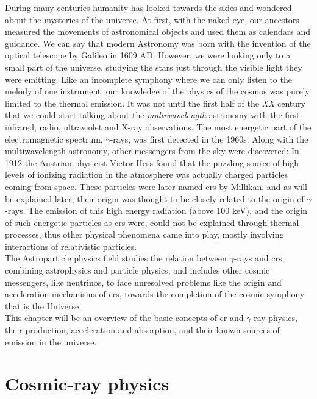 \documentclass[main.tex]{subfiles}
\begin{document}
\glsresetall
During many centuries humanity has looked towards the skies and wondered about the mysteries of the universe. At first, with the naked eye, our ancestors measured the movements of astronomical objects and used them as calendars and guidance. We can say that modern Astronomy was born with the invention of the optical telescope by Galileo in 1609 AD. However, we were looking only to a small part of the universe, studying the stars just through the visible light they were emitting. Like an incomplete symphony where we can only listen to the melody of one instrument, our knowledge of the physics of the cosmos was purely limited to the thermal emission. It was not until the first half of the \textit{XX} century that we could start talking about the \textit{multiwavelength} astronomy with the first infrared, radio, ultraviolet and X-ray observations. The most energetic part of the electromagnetic spectrum, $\gamma$-rays, was first detected in the 1960s.
Along with the multiwavelength astronomy, other messengers from the sky were discovered: In 1912 the Austrian physicist Victor Hess found that the puzzling source of high levels of ionizing radiation in the atmosphere was actually charged particles coming from space. These particles were later named \glspl{cr} by Millikan, and as will be explained later, their origin was thought to be closely related to the origin of $\gamma$-rays. The emission of this high energy radiation (above 100 keV), and the origin of such energetic particles as \glspl{cr} were, could not be explained through thermal processes, thus other physical phenomena came into play, mostly involving interactions of relativistic particles.\\ 
The Astroparticle physics field studies the relation between $\gamma$-rays and \glspl{cr}, combining astrophysics and particle physics, and includes other cosmic messengers, like neutrinos, to face unresolved problems like the origin and acceleration mechanisms of \glspl{cr}, towards the completion of the cosmic symphony that is the Universe.\\
This chapter will be an overview of the basic concepts of \gls{cr} and $\gamma$-ray physics, their production, acceleration and absorption, and their known sources of emission in the universe.

\section{Cosmic-ray physics}
\end{document}
